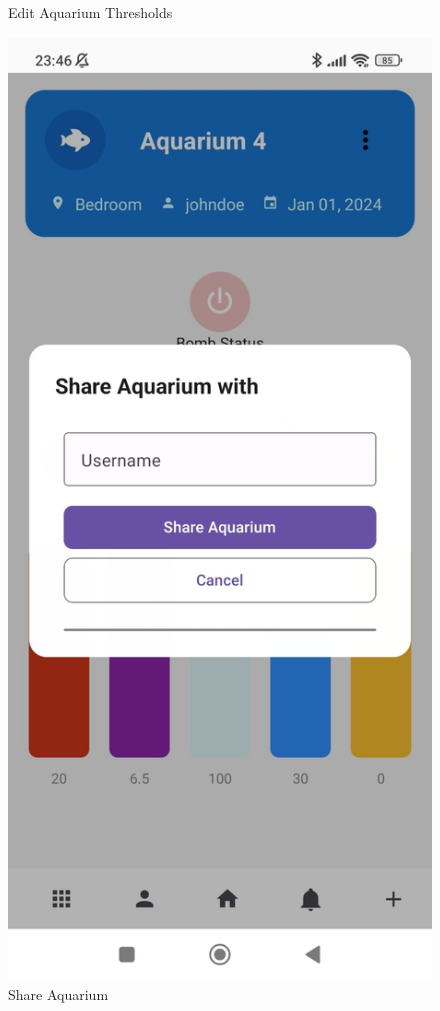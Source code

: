 \documentclass[11pt,a4paper]{article}
\begin{document}
\begin{figure}[H]
\begin{minipage}{0.35\textwidth}
        \caption*{Edit Aquarium Thresholds}
    \end{minipage}
    \hfill
    \begin{minipage}{0.35\textwidth}
        \centering
        \includegraphics[width=\linewidth]{Images/share.jpeg}
        \caption*{Share Aquarium}
    \end{minipage}
\end{figure}
\end{document}
